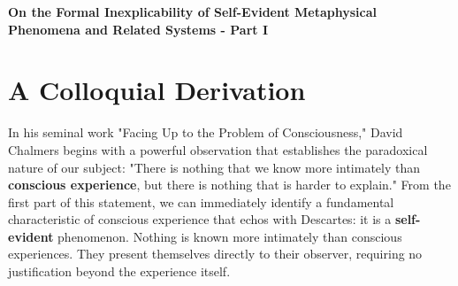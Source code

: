 \documentclass[runningheads]{llncs}
\begin{document}
\begin{center}
	{\Large\bfseries\boldmath
		On the Formal Inexplicability of Self-Evident Metaphysical Phenomena and Related Systems - Part I
		\par}
	\vskip 0.8cm
\end{center}

\begin{abstract}
Since Descartes first proclaimed "cogito, ergo sum" back in 1637, "I think, therefore I am" has become the Declaration of Independence for consciousness. Chalmers' informed us of the fact that science has an essentially Hard Problem on their hands. If he's right, conscious experience may forever elude our most powerful explanatory framework for physical phenomena. In other news, a group referring to themselves as the \textit{IIT-Concerned} recently proclaimed in a top-tier journal that any theory of consciousness that can't stand up to the scrutiny of science shall be deemed "unscientific." And the emergence of Semantic AI has transformed this philosophical oddity into a practical concern with real ethical implications. We simply cannot know whether an AI system is conscious without first knowing the necessary and sufficient conditions for consciousness. How can we provide a formal definition of conscious experience that preserves the essence of its metaphysical character in a framework that is physically falsifiable? 
		
\end{abstract}

\section{A Colloquial Derivation}

In his seminal work "Facing Up to the Problem of Consciousness," David Chalmers begins with a powerful observation that establishes the paradoxical nature of our subject: "There is nothing that we know more intimately than \textbf{conscious experience}, but there is nothing that is harder to explain." From the first part of this statement, we can immediately identify a fundamental characteristic of conscious experience that echos with Descartes: it is a \textbf{self-evident} phenomenon. Nothing is known more intimately than conscious experiences. They present themselves directly to their observer, requiring no justification beyond the experience itself.
\end{document}
